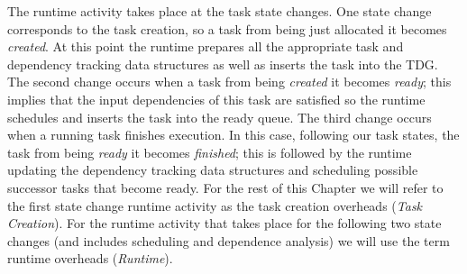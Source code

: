 The runtime activity takes place at the task state changes. 
One state change corresponds to the task creation, so a task from being just allocated it becomes \textit{created}. 
At this point the runtime prepares all the appropriate task and dependency tracking data structures as well as inserts the task into the TDG.
The second change occurs when a task from being \textit{created} it becomes \textit{ready};
this implies that the input dependencies of this task are satisfied so the runtime schedules and inserts the task into the ready queue.
The third change occurs when a running task finishes execution. 
In this case, following our task states, the task from being \textit{ready} it becomes \textit{finished}; this is followed by the runtime updating the dependency tracking data structures and scheduling possible successor tasks that become ready. 
For the rest of this Chapter we will refer to the first state change runtime activity as the task creation overheads (\textit{Task Creation}).
For the runtime activity that takes place for the following two state changes (and includes scheduling and dependence analysis) we will use the term runtime overheads (\textit{Runtime}).



%
%
%
%


